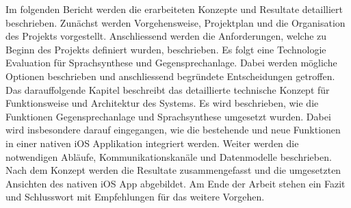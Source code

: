Im folgenden Bericht werden die erarbeiteten Konzepte und Resultate detailliert beschrieben.
Zunächst werden Vorgehensweise, Projektplan und die Organisation des Projekts vorgestellt.
Anschliessend werden die Anforderungen, welche zu Beginn des Projekts definiert wurden, beschrieben.
Es folgt eine Technologie Evaluation für Sprachsynthese und Gegensprechanlage.
Dabei werden mögliche Optionen beschrieben und anschliessend begründete Entscheidungen getroffen.
Das darauffolgende Kapitel beschreibt das detaillierte technische Konzept für Funktionsweise und Architektur des Systems.
Es wird beschrieben, wie die Funktionen Gegensprechanlage und Sprachsynthese umgesetzt wurden.
Dabei wird insbesondere darauf eingegangen, wie die bestehende und neue Funktionen in einer nativen iOS Applikation integriert werden.
Weiter werden die notwendigen Abläufe, Kommunikationskanäle und Datenmodelle beschrieben.
Nach dem Konzept werden die Resultate zusammengefasst und die umgesetzten Ansichten des nativen iOS App abgebildet.
Am Ende der Arbeit stehen ein Fazit und Schlusswort mit Empfehlungen für das weitere Vorgehen.

\clearpage
